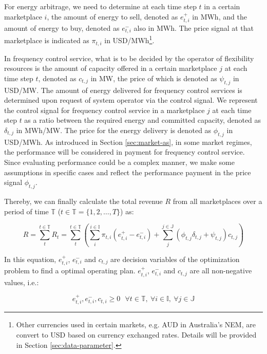 For energy arbitrage, we need to determine at each time step $t$ in a certain marketplace $i$, the amount of energy to sell, denoted as $e^+_{t,i}$ in MWh, and the amount of energy to buy, denoted as $e^-_{t,i}$ also in MWh. The price signal at that marketplace is indicated as $\pi_{t,i}$ in USD/MWh\footnote{Other currencies used in certain markets, e.g. AUD in Australia's NEM, are convert to USD based on currency exchanged rates. Details will be provided in Section \ref{sec:data-parameter}.}.

In frequency control service, what is to be decided by the operator of flexibility resources is the amount of capacity offered in a certain marketplace $j$ at each time step $t$, denoted as $c_{t,j}$ in MW, the price of which is denoted as $\psi_{t,j}$ in USD/MW. The amount of energy delivered for frequency control services is determined upon request of system operator via the control signal. We represent the control signal for frequency control service in a marketplace $j$ at each time step $t$ as a ratio between the required energy and committed capacity, denoted as $\delta_{t,j}$ in MWh/MW. The price for the energy delivery is denoted as $\phi_{t,j}$ in USD/MWh. As introduced in Section \ref{sec:market-as}, in some market regimes, the performance will be considered in payment for frequency control service. Since evaluating performance could be a complex manner, we make some assumptions in specific cases and reflect the performance payment in the price signal $\phi_{t,j}$.

Thereby, we can finally calculate the total revenue $R$ from all marketplaces over a period of time $\mathbb{T}$ ($t \in \mathbb{T} = \{1,2,\dots, T\}$) as:

\begin{equation}
\label{eq:module-revenue}
R =  \sum_{t}^{t \in \mathbb{T}} R_t = \sum_{t}^{t \in \mathbb{T}} \left( \sum_{i}^{i \in \mathbb{I}}  \pi_{t,i} (e_{t,i}^{+} - e_{t,i}^{-})  + \sum_{j}^{j \in \mathbb{J}} (\phi_{t,j} \delta_{t,j} + \psi_{t,j}) c_{t,j} \right)
\end{equation}

In this equation, $e^+_{t,i}$, $e^-_{t,i}$ and $c_{t,j}$ are decision variables of the optimization problem to find a optimal operating plan. $e^+_{t,i}$, $e^-_{t,i}$ and $c_{t,j}$ are all non-negative values, i.e.:

\begin{equation*}
e^+_{t,i}, e^-_{t,i}, c_{t,i} \geq 0 ~~~ \forall t \in \mathbb{T},~ \forall i \in \mathbb{I},~ \forall j \in \mathbb{J}
\end{equation*}

